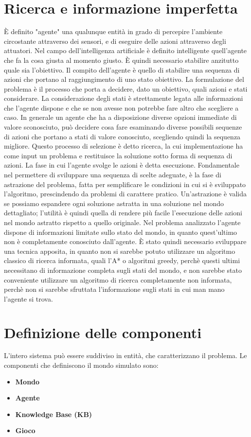 \section{Ricerca e informazione imperfetta}
È definito "agente" una qualunque entità in grado di percepire l'ambiente circostante attraverso dei sensori, e di eseguire delle azioni attraverso degli attuatori. Nel campo dell'intelligenza artificiale è definito intelligente quell'agente che fa la cosa giusta al momento giusto. È quindi necessario stabilire anzitutto quale sia l'obiettivo. Il compito dell'agente è quello di stabilire una sequenza di azioni che portano al raggiungimento di uno stato obiettivo. 
La formulazione del problema è il processo che porta a decidere, dato un obiettivo, quali azioni e stati considerare. La considerazione degli stati è strettamente legata alle informazioni che l'agente dispone e che se non avesse non potrebbe fare altro che scegliere a caso. In generale un agente che ha a disposizione diverse opzioni immediate di valore sconosciuto, può decidere cosa fare esaminando diverse possibili sequenze di azioni che portano a stati di valore conosciuto, scegliendo quindi la sequenza migliore. Questo processo di selezione è detto ricerca, la cui implementazione ha come input un problema e restituisce la soluzione sotto forma di sequenza di azioni. La fase in cui l'agente svolge le azioni è detta esecuzione.
Fondamentale nel permettere di sviluppare una sequenza di scelte adeguate, è la fase di astrazione del problema, fatta per semplificare le condizioni in cui si è sviluppato l'algoritmo, prescindendo da problemi di carattere pratico. Un'astrazione è valida se possiamo espandere ogni soluzione astratta in una soluzione nel mondo dettagliato; l'utilità è quindi quella di rendere più facile l'esecuzione delle azioni nel mondo astratto rispetto a quello originale. 
Nel problema analizzato l'agente dispone di informazioni limitate sullo stato del mondo, in quanto quest'ultimo non è completamente conosciuto dall'agente. È stato quindi necessario sviluppare una tecnica apposita, in quanto non si sarebbe potuto utilizzare un algoritmo classico di ricerca informata, quali l'A* o algoritmi greedy, perchè questi ultimi necessitano di informazione completa sugli stati del mondo, e non sarebbe stato conveniente utilizzare un algoritmo di ricerca completamente non informata, perchè non si sarebbe sfruttata l'informazione sugli stati in cui man mano l'agente si trova.


\section{Definizione delle componenti}
L'intero sistema può essere suddiviso in entità, che caratterizzano il problema. 
Le componenti che definiscono il mondo simulato sono:
\begin{itemize}
\item \textbf{Mondo}

\item \textbf{Agente}

\item \textbf{Knowledge Base (KB)}

\item \textbf{Gioco} 	
\end{itemize}

